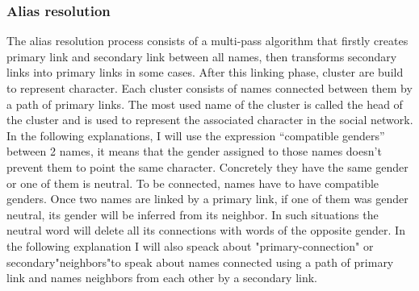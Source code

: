 \documentclass[a4paper, 12pt]{report}
\begin{document}
\subsubsection{Alias resolution}
\label{section:alias}
The alias resolution process consists of a multi-pass algorithm that firstly creates primary link and secondary link between all names, 
then transforms secondary links into  primary links in some cases. After this linking phase, cluster are build to represent character. 
Each cluster consists of names connected between them by a path of primary links. 
The most used name of the cluster is called the head of the cluster and is used to represent the associated character in the social network. 
In the following explanations, I will use the expression ``compatible genders'' between 2 names, 
it means that the gender assigned to those names doesn't prevent them to point the same character. 
Concretely they have the same gender or one of them is neutral. To be connected, names have to have compatible genders. 
Once two names are linked by a  primary link, if one of them was gender neutral, its gender will be inferred from its neighbor. 
In such situations the neutral word will delete all its connections with words of the opposite gender. 
In the following explanation I will also speack about "primary-connection" or secondary"neighbors"to speak about names connected using a path of primary link 
and names neighbors from each other by a secondary link. \\
\end{document}
